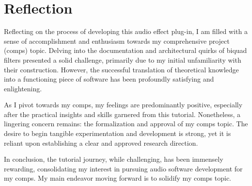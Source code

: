 \documentclass[10pt,twocolumn]{article}
\begin{document}
\section{Reflection}

Reflecting on the process of developing this audio effect plug-in, I am filled with a sense of accomplishment and enthusiasm towards my comprehensive project (comps) topic. Delving into the documentation and architectural quirks of biquad filters presented a solid challenge, primarily due to my initial unfamiliarity with their construction. However, the successful translation of theoretical knowledge into a functioning piece of software has been profoundly satisfying and enlightening.

As I pivot towards my comps, my feelings are predominantly positive, especially after the practical insights and skills garnered from this tutorial. Nonetheless, a lingering concern remains: the formalization and approval of my comps topic. The desire to begin tangible experimentation and development is strong, yet it is reliant upon establishing a clear and approved research direction.

In conclusion, the tutorial journey, while challenging, has been immensely rewarding, consolidating my interest in pursuing audio software development for my comps. My main endeavor moving forward is to solidify my comps topic.


\printbibliography
\end{document}
